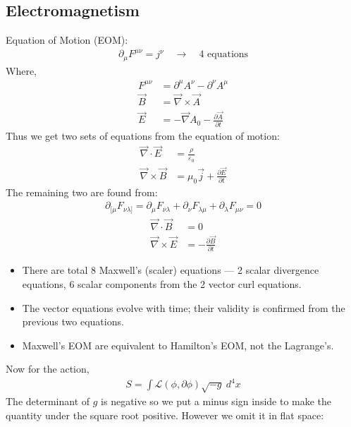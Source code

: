 \documentclass[14pt]{article} %
\begin{document}
\subsection{Electromagnetism}
Equation of Motion (EOM):
\begin{align*}
\partial_\mu F^{\mu \nu} = j^\nu \quad \to \quad 4\text{ equations}
\end{align*}
Where,
\begin{align*}
F^{\mu \nu} &= \partial^\mu A^\nu - \partial^\nu A^\mu \\
\vec{B} &= \vec{\nabla} \times \vec{A} \\
\vec{E} &= -\vec{\nabla} A_0 - \frac{\partial \vec{A}}{\partial t}
\end{align*}
Thus we get two sets of equations from the equation of motion:
\begin{align*}
\vec{\nabla} \cdot \vec{E} &= \frac{\rho}{\varepsilon_0} \tag{M1} \\
\vec{\nabla} \times \vec{B} &= \mu_0 \vec{j} + \frac{\partial \vec{E}}{\partial t} \tag{M3}
\end{align*}
The remaining two are found from:
\begin{align*}
\partial_{[\mu}F_{\nu \lambda ]} = \partial_\mu F_{\nu \lambda} + \partial_\nu F_{\lambda \mu} + \partial_\lambda F_{\mu \nu} = 0 \tag*{[Bianchi identity]}
\end{align*}
\begin{align*}
\vec{\nabla} \cdot \vec{B} &= 0 \tag{M2} \\
\vec{\nabla} \times \vec{E} &= -\frac{\partial \vec{B}}{\partial t} \tag{M4}
\end{align*}
\begin{tcolorbox}[ title=Notes]
\begin{itemize}
    \item There are total 8 Maxwell’s (scaler) equations — 2 scalar divergence equations, 6 scalar components from the 2 vector curl equations.
    \item The vector equations evolve with time; their validity is confirmed from the previous two equations.
    \item Maxwell's EOM are equivalent to Hamilton's EOM, not the Lagrange's.
\end{itemize}
\end{tcolorbox}
Now for the action,
\begin{align*}
S = \int \mathcal{L}(\phi, \partial \phi) \sqrt{-g}~ d^4x
\end{align*}
The determinant of $g$ is negative so we put a minus sign inside to make the quantity under the square root positive. However we omit it in flat space:
\end{document}
